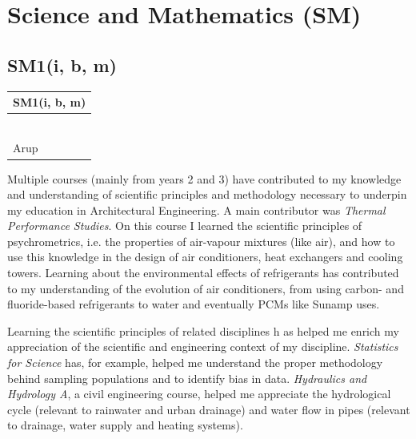 
\section{Science and Mathematics (SM)}

\subsection*{SM1(i, b, m)}

\begin{table}
	\begin{tabular}{|ll|}
		\hline
		\multicolumn{2}{|c|}{\cellcolor[HTML]{F8A102}\textbf{SM1(i, b, m) \nomaster}} \\ \hline
		\ConTechOne & \BST \\
		\MechB & \ConTechTwo \\
		\Acoustics & \HYD \\
		\Stats & \EPA \\
		\ELS & \TPS \\
		\LAB & \WSD \\
		Arup &  \\ \hline
	\end{tabular}
\end{table}

Multiple courses (mainly from years 2 and 3) have contributed to my knowledge and understanding of scientific principles and methodology necessary to underpin my education in Architectural Engineering.
A main contributor was \textit{Thermal Performance Studies}.
On this course I learned the scientific principles of psychrometrics, i.e. the properties of air-vapour mixtures (like air), and how to use this knowledge in the design of air conditioners, heat exchangers and cooling towers.
Learning about the environmental effects of refrigerants has contributed to my understanding of the evolution of air conditioners, from using carbon- and fluoride-based refrigerants to water and eventually PCMs like Sunamp uses.

Learning the scientific principles of related disciplines h as helped me enrich my appreciation of the scientific and engineering context of my discipline.
\textit{Statistics for Science} has, for example, helped me understand the proper methodology behind sampling populations and to identify bias in data.
\textit{Hydraulics and Hydrology A}, a civil engineering course, helped me appreciate the hydrological cycle (relevant to rainwater and urban drainage) and water flow in pipes (relevant to drainage, water supply and heating systems).








